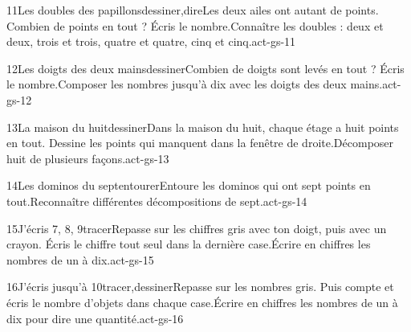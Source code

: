 \begin{activite}{11}{Les doubles des papillons}{dessiner,dire}{Les deux ailes ont autant de points. Combien de points en tout ? {\otBold\color{otNavy}Écris} le nombre.}{Connaître les doubles : deux et deux, trois et trois, quatre et quatre, cinq et cinq.}{act-gs-11}
\end{activite}
\begin{activite}{12}{Les doigts des deux mains}{dessiner}{Combien de doigts sont levés en tout ? {\otBold\color{otNavy}Écris} le nombre.}{Composer les nombres jusqu’à dix avec les doigts des deux mains.}{act-gs-12}
\end{activite}
\begin{activite}{13}{La maison du huit}{dessiner}{Dans la maison du huit, chaque étage a huit points en tout. {\otBold\color{otNavy}Dessine} les points qui manquent dans la fenêtre de droite.}{Décomposer huit de plusieurs façons.}{act-gs-13}
\end{activite}
\begin{activite}{14}{Les dominos du sept}{entourer}{Entoure les dominos qui ont {\otBold\color{otNavy}sept} points en tout.}{Reconnaître différentes décompositions de sept.}{act-gs-14}
\end{activite}
\begin{activite}{15}{J’écris 7, 8, 9}{tracer}{Repasse sur les chiffres gris avec ton doigt, puis avec un crayon. Écris le chiffre {\otBold\color{otNavy}tout seul} dans la dernière case.}{Écrire en chiffres les nombres de un à dix.}{act-gs-15}
\end{activite}
\begin{activite}{16}{J’écris jusqu’à 10}{tracer,dessiner}{Repasse sur les nombres gris. Puis compte et {\otBold\color{otNavy}écris} le nombre d’objets dans chaque case.}{Écrire en chiffres les nombres de un à dix pour dire une quantité.}{act-gs-16}
\end{activite}
